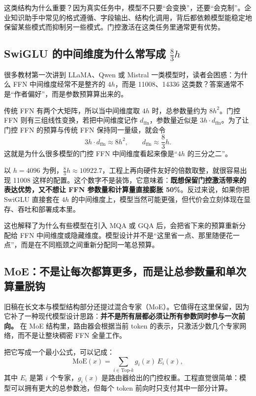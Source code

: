 这类结构为什么重要？因为真实任务中，模型不只要“会变换”，还要“会克制”。企业知识助手中常见的格式遵循、字段输出、结构化调用，背后都依赖模型能稳定地保留某些模式而抑制另一些模式。门控激活在这类任务里通常更有优势。

\subsection{SwiGLU 的中间维度为什么常写成 \texorpdfstring{$\frac{8}{3}h$}{8/3h}}
很多教材第一次讲到 LLaMA、Qwen 或 Mistral 一类模型时，读者会困惑：为什么 FFN 中间维度经常不是整齐的 \(4h\)，而是 11008、14336 这类数？答案通常不是“作者偏好”，而是参数预算算出来的。

传统 FFN 有两个大矩阵，所以当中间维度取 \(4h\) 时，总参数量约为 \(8h^2\)。门控 FFN 则有三组线性变换，若把中间维度记作 \(d_{\mathrm{ffn}}\)，参数量近似是 \(3h\cdot d_{\mathrm{ffn}}\)。为了让门控 FFN 的预算与传统 FFN 保持同一量级，就会令
\[
3h\cdot d_{\mathrm{ffn}}\approx 8h^2,
\qquad
d_{\mathrm{ffn}}\approx \frac{8}{3}h.
\]
这就是为什么很多模型的门控 FFN 中间维度看起来像是“\(4h\) 的三分之二”。

以 \(h=4096\) 为例，\(\frac{8}{3}h\approx 10922.7\)，工程上再向硬件友好的倍数取整，就很容易出现 11008 这样的配置。这个数字不是装饰，它意味着：\textbf{既想保留门控激活带来的表达优势，又不想让 FFN 参数量和计算量直接膨胀 50\%}。反过来说，如果你把 SwiGLU 直接套在 \(4h\) 的中间维度上，模型当然可能更强，但代价会立刻体现在显存、吞吐和部署成本里。

这也解释了为什么有些模型在引入 MQA 或 GQA 后，会把省下来的预算重新分配给 FFN 中间维度或隐藏维度。模型设计并不是“这里省一点、那里随便花一点”，而是在不同瓶颈之间重新分配同一笔总预算。

\subsection{MoE：不是让每次都算更多，而是让总参数量和单次算量脱钩}
旧稿在长文本与模型结构部分还提过混合专家（MoE）。它值得在这里保留，因为它补了一种现代模型设计思路：\textbf{并不是所有层都必须让所有参数同时参与一次前向。} 在 MoE 结构里，路由器会根据当前 token 的表示，只激活少数几个专家网络，而不是让整块稠密 FFN 全量工作。

把它写成一个最小公式，可以记成：
\[
\mathrm{MoE}(x)=\sum_{i \in \mathrm{Top}\text{-}k} g_i(x)\,E_i(x),
\]
其中 \(E_i\) 是第 \(i\) 个专家，\(g_i(x)\) 是路由器给出的门控权重。工程直觉很简单：模型可以拥有更大的总参数池，但每个 token 前向时只支付其中一部分计算。

